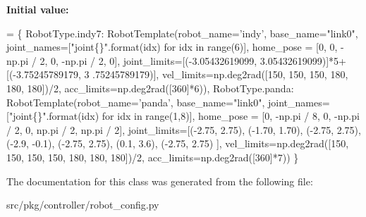 {\bfseries Initial value\+:}
\begin{DoxyCode}
=  \{
        RobotType.indy7: RobotTemplate(robot\_name=\textcolor{stringliteral}{'indy'}, base\_name=\textcolor{stringliteral}{"link0"},
                                       joint\_names=[\textcolor{stringliteral}{"joint\{\}"}.format(idx) \textcolor{keywordflow}{for} idx \textcolor{keywordflow}{in} range(6)],
                                       home\_pose = [0, 0, -np.pi / 2, 0, -np.pi / 2, 0],
                                       joint\_limits=[(-3.05432619099, 3.05432619099)]*5+[(-3.75245789179, 3
      .75245789179)],
                                       vel\_limits=np.deg2rad([150, 150, 150, 180, 180, 180])/2,
                                       acc\_limits=np.deg2rad([360]*6)),
        RobotType.panda: RobotTemplate(robot\_name=\textcolor{stringliteral}{'panda'}, base\_name=\textcolor{stringliteral}{"link0"},
                                       joint\_names=[\textcolor{stringliteral}{"joint\{\}"}.format(idx) \textcolor{keywordflow}{for} idx \textcolor{keywordflow}{in} range(1,8)],
                                       home\_pose = [0, -np.pi / 8, 0, -np.pi / 2, 0, np.pi / 2, np.pi / 2],
                                       joint\_limits=[(-2.75, 2.75), (-1.70, 1.70), (-2.75, 2.75),
                                                     (-2.9, -0.1), (-2.75, 2.75), (0.1, 3.6), (-2.75, 2.75)
      ],
                                       vel\_limits=np.deg2rad([150, 150, 150, 150, 180, 180, 180])/2,
                                       acc\_limits=np.deg2rad([360]*7))
    \}
\end{DoxyCode}


The documentation for this class was generated from the following file\+:\begin{DoxyCompactItemize}
\item 
src/pkg/controller/robot\+\_\+config.\+py\end{DoxyCompactItemize}
